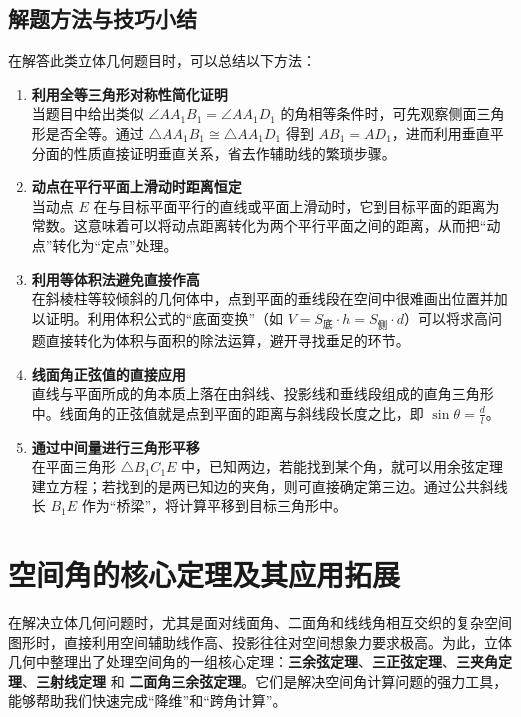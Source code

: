 \documentclass[11pt,a4paper]{ctexart}
\begin{document}
\subsection{解题方法与技巧小结}
在解答此类立体几何题目时，可以总结以下方法：
\begin{enumerate}
    \item \textbf{利用全等三角形对称性简化证明} \\
    当题目中给出类似 $\angle AA_1B_1 = \angle AA_1D_1$ 的角相等条件时，可先观察侧面三角形是否全等。通过 $\triangle AA_1B_1 \cong \triangle AA_1D_1$ 得到 $AB_1 = AD_1$，进而利用垂直平分面的性质直接证明垂直关系，省去作辅助线的繁琐步骤。
    \item \textbf{动点在平行平面上滑动时距离恒定} \\
    当动点 $E$ 在与目标平面平行的直线或平面上滑动时，它到目标平面的距离为常数。这意味着可以将动点距离转化为两个平行平面之间的距离，从而把“动点”转化为“定点”处理。
    \item \textbf{利用等体积法避免直接作高} \\
    在斜棱柱等较倾斜的几何体中，点到平面的垂线段在空间中很难画出位置并加以证明。利用体积公式的“底面变换”（如 $V = S_{\text{底}} \cdot h = S_{\text{侧}} \cdot d$）可以将求高问题直接转化为体积与面积的除法运算，避开寻找垂足的环节。
    \item \textbf{线面角正弦值的直接应用} \\
    直线与平面所成的角本质上落在由斜线、投影线和垂线段组成的直角三角形中。线面角的正弦值就是点到平面的距离与斜线段长度之比，即 $\sin\theta = \frac{d}{l}$。
    \item \textbf{通过中间量进行三角形平移} \\
    在平面三角形 $\triangle B_1C_1E$ 中，已知两边，若能找到某个角，就可以用余弦定理建立方程；若找到的是两已知边的夹角，则可直接确定第三边。通过公共斜线长 $B_1E$ 作为“桥梁”，将计算平移到目标三角形中。
\end{enumerate}

\newpage
\section{空间角的核心定理及其应用拓展}

在解决立体几何问题时，尤其是面对线面角、二面角和线线角相互交织的复杂空间图形时，直接利用空间辅助线作高、投影往往对空间想象力要求极高。为此，立体几何中整理出了处理空间角的一组核心定理：\textbf{三余弦定理}、\textbf{三正弦定理}、\textbf{三夹角定理}、\textbf{三射线定理} 和 \textbf{二面角三余弦定理}。它们是解决空间角计算问题的强力工具，能够帮助我们快速完成“降维”和“跨角计算”。
\end{document}
